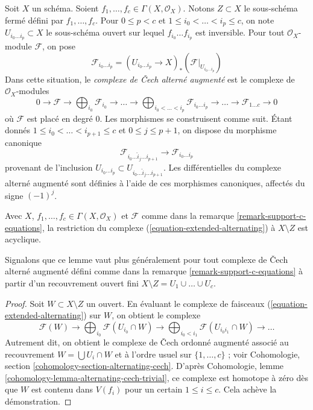 \begin{remark}
\label{remark-support-c-equations}
Soit $X$ un schéma. Soient $f_1, \ldots, f_c \in \Gamma(X, \mathcal{O}_X)$.
Notons $Z \subset X$ le sous-schéma fermé défini par $f_1, \ldots, f_c$.
Pour $0 \leq p < c$ et $1 \leq i_0 < \ldots < i_p \leq c$, on note
$U_{i_0 \ldots i_p} \subset X$ le sous-schéma ouvert sur lequel
$f_{i_0} \ldots f_{i_p}$ est inversible. Pour tout $\mathcal{O}_X$-module
$\mathcal{F}$, on pose
$$
\mathcal{F}_{i_0 \ldots i_p} =
(U_{i_0 \ldots i_p} \to X)_*(\mathcal{F}|_{U_{i_0 \ldots i_p}})
$$
Dans cette situation, le {\it complexe de {\v C}ech alterné augmenté}
est le complexe de $\mathcal{O}_X$-modules
\begin{equation}
\label{equation-extended-alternating}
0 \to \mathcal{F} \to
\bigoplus\nolimits_{i_0} \mathcal{F}_{i_0} \to
\ldots \to
\bigoplus\nolimits_{i_0 < \ldots < i_p} \mathcal{F}_{i_0 \ldots i_p} \to
\ldots \to \mathcal{F}_{1 \ldots c} \to 0
\end{equation}
où $\mathcal{F}$ est placé en degré $0$. Les morphismes se construisent
comme suit. Étant donnés
$1 \leq i_0 < \ldots < i_{p + 1} \leq c$ et $0 \leq j \leq p + 1$, on
dispose du morphisme canonique
$$
\mathcal{F}_{i_0 \ldots \hat i_j \ldots i_{p + 1}} \to
\mathcal{F}_{i_0 \ldots i_p}
$$
provenant de l'inclusion
$U_{i_0 \ldots i_p} \subset U_{i_0 \ldots \hat i_j \ldots i_{p + 1}}$.
Les différentielles du complexe alterné augmenté sont définies à l'aide de ces
morphismes canoniques, affectés du signe $(-1)^j$.
\end{remark}

\begin{lemma}
\label{lemma-extended-alternating-zero}
Avec $X$, $f_1, \ldots, f_c \in \Gamma(X, \mathcal{O}_X)$ et
$\mathcal{F}$ comme dans la remarque \ref{remark-support-c-equations},
la restriction du complexe (\ref{equation-extended-alternating}) à
$X \setminus Z$ est acyclique.
\end{lemma}

\noindent
Signalons que ce lemme vaut plus généralement pour tout
complexe de {\v C}ech alterné augmenté défini comme dans la
remarque \ref{remark-support-c-equations} à partir d'un recouvrement
ouvert fini $X \setminus Z = U_1 \cup \ldots \cup U_c$.

\begin{proof}
Soit $W \subset X \setminus Z$ un ouvert. En évaluant le complexe
de faisceaux (\ref{equation-extended-alternating}) sur $W$, on obtient le
complexe
$$
\mathcal{F}(W) \to \bigoplus\nolimits_{i_0} \mathcal{F}(U_{i_0} \cap W) \to
\bigoplus\nolimits_{i_0 < i_1} \mathcal{F}(U_{i_0i_1} \cap W) \to \ldots
$$
Autrement dit, on obtient le complexe de {\v C}ech ordonné augmenté
associé au recouvrement $W = \bigcup U_i \cap W$ et à l'ordre
usuel sur $\{1, \ldots, c\}$ ; voir
Cohomologie, section \ref{cohomology-section-alternating-cech}.
D'après Cohomologie, lemme \ref{cohomology-lemma-alternating-cech-trivial},
ce complexe est homotope à zéro dès que $W$ est contenu dans
$V(f_i)$ pour un certain $1 \leq i \leq c$. Cela achève la démonstration.
\end{proof}

